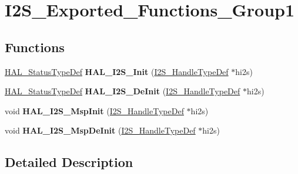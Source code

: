 \hypertarget{group___i2_s___exported___functions___group1}{}\section{I2\+S\+\_\+\+Exported\+\_\+\+Functions\+\_\+\+Group1}
\label{group___i2_s___exported___functions___group1}
\subsection*{Functions}
\begin{DoxyCompactItemize}
\item 
\hyperlink{stm32f4xx__hal__def_8h_a63c0679d1cb8b8c684fbb0632743478f}{H\+A\+L\+\_\+\+Status\+Type\+Def} {\bfseries H\+A\+L\+\_\+\+I2\+S\+\_\+\+Init} (\hyperlink{struct_i2_s___handle_type_def}{I2\+S\+\_\+\+Handle\+Type\+Def} $\ast$hi2s)\hypertarget{group___i2_s___exported___functions___group1_ga605f23b9dc1f0979f4b59702fb8d058d}{}\label{group___i2_s___exported___functions___group1_ga605f23b9dc1f0979f4b59702fb8d058d}

\item 
\hyperlink{stm32f4xx__hal__def_8h_a63c0679d1cb8b8c684fbb0632743478f}{H\+A\+L\+\_\+\+Status\+Type\+Def} {\bfseries H\+A\+L\+\_\+\+I2\+S\+\_\+\+De\+Init} (\hyperlink{struct_i2_s___handle_type_def}{I2\+S\+\_\+\+Handle\+Type\+Def} $\ast$hi2s)\hypertarget{group___i2_s___exported___functions___group1_ga9119fe0f644a9f011415afaf8661232a}{}\label{group___i2_s___exported___functions___group1_ga9119fe0f644a9f011415afaf8661232a}

\item 
void {\bfseries H\+A\+L\+\_\+\+I2\+S\+\_\+\+Msp\+Init} (\hyperlink{struct_i2_s___handle_type_def}{I2\+S\+\_\+\+Handle\+Type\+Def} $\ast$hi2s)\hypertarget{group___i2_s___exported___functions___group1_ga5033142a7bf0de4513782bbee1823a97}{}\label{group___i2_s___exported___functions___group1_ga5033142a7bf0de4513782bbee1823a97}

\item 
void {\bfseries H\+A\+L\+\_\+\+I2\+S\+\_\+\+Msp\+De\+Init} (\hyperlink{struct_i2_s___handle_type_def}{I2\+S\+\_\+\+Handle\+Type\+Def} $\ast$hi2s)\hypertarget{group___i2_s___exported___functions___group1_ga7ef92677a8ff770f754d4dfc2aceb39b}{}\label{group___i2_s___exported___functions___group1_ga7ef92677a8ff770f754d4dfc2aceb39b}

\end{DoxyCompactItemize}


\subsection{Detailed Description}
